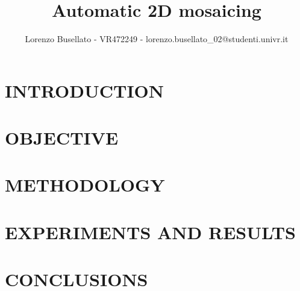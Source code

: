 \documentclass[peerreview]{IEEEtran} %
\title{Automatic 2D mosaicing}
\author{Lorenzo Busellato - VR472249 -  lorenzo.busellato\_02@studenti.univr.it}
\begin{document}
\maketitle

\tableofcontents

\IEEEpeerreviewmaketitle

\section{INTRODUCTION}

\section{OBJECTIVE}

\section{METHODOLOGY}

\section{EXPERIMENTS AND RESULTS}

\section{CONCLUSIONS}
\end{document}
